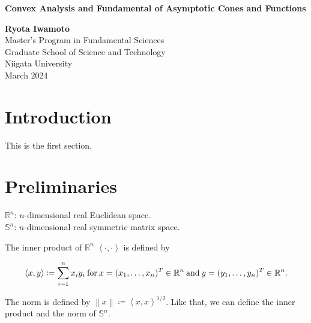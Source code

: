 \documentclass[a4paper,11pt, oneside]{book}
\theoremstyle{definition}
\newcommand{\NDemenstionalRealEuclideanSpace}{\mathbb{R}^n}
\newcommand{\NDemenstionalRealSymmetricMatrixSpace}{\mathbb{S}^n}
\newcommand{\InnerProduct}[2]{\left\langle {#1},{#2}\right\rangle} %
\begin{document}
\begin{titlepage}
\begin{center}
\vspace*{10mm}
{\bf \Huge Convex Analysis and Fundamental of Asymptotic Cones and Functions}
\vspace{80mm}

{\bf \Huge Ryota Iwamoto}\\
\vspace{15mm}
{\huge Master's Program in Fundamental Sciences}\\
\vspace{5mm}
{\huge Graduate School of Science and Technology}\\
\vspace{5mm}
{\huge Niigata University}\\
\vspace{15mm}
{\huge March 2024}
\end{center}
\end{titlepage}

\tableofcontents

\chapter{Introduction}
This is the first section.
\blindtext

\blindtext


\chapter{Preliminaries}

$\NDemenstionalRealEuclideanSpace$: $n$-dimensional real Euclidean space. \\
$\NDemenstionalRealSymmetricMatrixSpace$: $n$-dimensional real symmetric matrix space.

The inner product of $\NDemenstionalRealEuclideanSpace$ $\left\langle \cdot ,\cdot \right\rangle$  is defined by

  \begin{equation}
    \InnerProduct{x}{y} \coloneqq \sum_{i = 1}^{n} x_i y_i \:\text{for}\: x=(x_1,\dots,x_n)^T \in \mathbb{R}^n \:\text{and}\: y=(y_1,\dots,y_n)^T \in \mathbb{R}^n. \notag
  \end{equation}

The norm is defined by $\left\lVert x \right\rVert \coloneqq \InnerProduct{x}{x} ^{1/2} $. Like that, we can define the inner product and the norm of $\NDemenstionalRealSymmetricMatrixSpace$.
\end{document}
